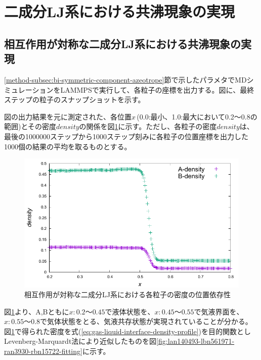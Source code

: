 \documentclass[titlepage]{jsreport}
\begin{document}
\section{二成分LJ系における共沸現象の実現} \label{results-sec:bi-component-azeotrope}
\subsection{相互作用が対称な二成分LJ系における共沸現象の実現} \label{results-subsec:bi-symmetric-component-azeotrope}
\ref{method-subsec:bi-symmetric-component-azeotrope}節で示したパラメタでMDシミュレーションをLAMMPSで実行して、各粒子の座標を出力する。図に、最終ステップの粒子のスナップショットを示す。

図の出力結果を元に測定された、各位置$x$\,(0.0:最小、1.0:最大において0.2〜0.8の範囲)とその密度$density$の関係を図\ref{fig:lan140493-lbn561971-ran3930-rbn15722}に示す。ただし、各粒子の密度$density$は、最後の1000000ステップから1000ステップ刻みに各粒子の位置座標を出力した1000個の結果の平均を取るものとする。

\begin{figure}[htbp]
    \begin{center}
        \includegraphics[width=14cm]{fig/lan140493-lbn561971-ran3930-rbn15722/lan140493-lbn561971-ran3930-rbn15722.pdf}
    \end{center}
    \caption{相互作用が対称な二成分LJ系における各粒子の密度の位置依存性}
    \label{fig:lan140493-lbn561971-ran3930-rbn15722}
\end{figure}

図\ref{fig:lan140493-lbn561971-ran3930-rbn15722}より、A,Bともに$x:0.2〜0.45$で液体状態を、$x:0.45〜0.55$で気液界面を、$x:0.55〜0.8$で気体状態をとる、気液共存状態が実現されていることが分かる。図\ref{fig:lan140493-lbn561971-ran3930-rbn15722}で得られた密度を式(\ref{eq:gas-liquid-interface-density-profile})を目的関数としLevenberg-Marquardt法により近似したものを図\ref{fig:lan140493-lbn561971-ran3930-rbn15722-fitting}に示す。
\end{document}

